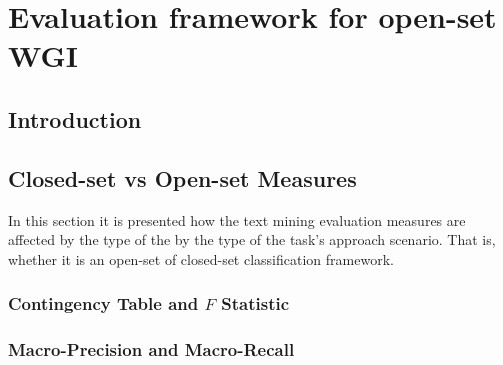 
\chapter{Evaluation framework for open-set WGI}

\label{chap:eval_methods}


\newcommand{\keyword}[1]{\textbf{#1}}
\newcommand{\tabhead}[1]{\textbf{#1}}
\newcommand{\code}[1]{\texttt{#1}}
\newcommand{\file}[1]{\texttt{\bfseries#1}}
\newcommand{\option}[1]{\texttt{\itshape#1}}


\section{Introduction}\label{chap:eval_methods:sec:intro}


\section{Closed-set vs Open-set Measures}\label{chap:eval_methods:sec:measures} 

In this section it is presented how the text mining evaluation measures are affected by the type of the by the type of the task's approach scenario. That is, whether it is an open-set of closed-set classification framework.


\subsection{Contingency Table and $F$ Statistic}\label{chap:eval_methods:sec:prf_micro}



\subsection{Macro-Precision and Macro-Recall}\label{chap:eval_methods:sec:prf_macro}



